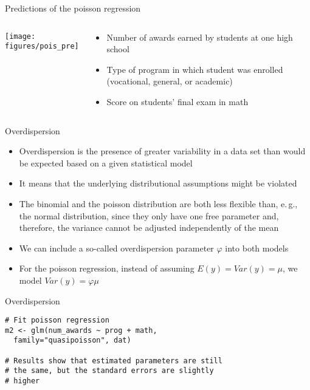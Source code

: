 \documentclass{beamer}
\begin{document}
\begin{frame}{Predictions of the poisson regression}
\begin{columns}[c]
\begin{column}{6cm}
  \texttt{[image: figures/pois\_pre]}
\end{column}
\begin{column}{5cm}
  \begin{itemize}
    \item Number of awards earned by students at one high school
    \item Type of program in which student was enrolled (vocational,
    general, or academic)
    \item Score on students' final exam in math
  \end{itemize}
\end{column}
\end{columns}
\end{frame}

\begin{frame}{Overdispersion}
  \begin{itemize}
    \item Overdispersion is the presence of greater variability in a data
      set than would be expected based on a given statistical model
    \item It means that the underlying distributional assumptions might be
      violated
    \item The binomial and the poisson distribution are both less flexible
      than, e.\,g., the normal distribution, since they only have one free
      parameter and, therefore, the variance cannot be adjusted
      independently of the mean
    \item We can include a so-called overdispersion parameter $\varphi$
      into both models
    \item For the poisson regression, instead of assuming $E(y) = Var(y) =
      \mu$, we model $Var(y) = \varphi\mu$
  \end{itemize}
\end{frame}

{

\begin{frame}[fragile]{Overdispersion}
\begin{lstlisting}
# Fit poisson regression
m2 <- glm(num_awards ~ prog + math, 
  family="quasipoisson", dat)

# Results show that estimated parameters are still
# the same, but the standard errors are slightly
# higher
\end{lstlisting}
\end{frame}

}
\end{document}
